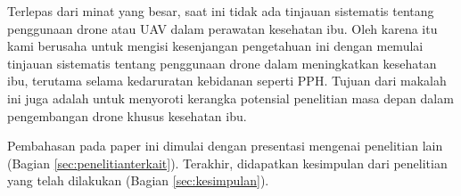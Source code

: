 Terlepas dari minat yang besar, saat ini tidak ada tinjauan sistematis tentang penggunaan drone atau UAV dalam perawatan kesehatan ibu. Oleh karena itu kami berusaha untuk mengisi kesenjangan pengetahuan ini dengan memulai tinjauan sistematis tentang penggunaan drone dalam meningkatkan kesehatan ibu, terutama selama kedaruratan kebidanan seperti PPH. Tujuan dari makalah ini juga adalah untuk menyoroti kerangka potensial penelitian masa depan dalam pengembangan drone khusus kesehatan ibu.

Pembahasan pada paper ini dimulai dengan presentasi mengenai penelitian lain (Bagian \ref{sec:penelitianterkait}).
Terakhir, didapatkan kesimpulan dari penelitian yang telah dilakukan (Bagian \ref{sec:kesimpulan}).
